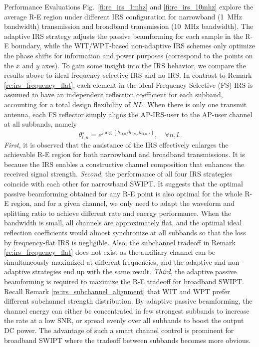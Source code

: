 \documentclass[journal]{IEEEtran}
\begin{document}
\begin{section}{Performance Evaluations}
		Fig.~\ref{fi:re_irs_1mhz} and \ref{fi:re_irs_10mhz} explore the average R-E region under different IRS configuration for narrowband (\SI{1}{\MHz} bandwidth) transmission and broadband transmission (\SI{10}{\MHz} bandwidth). The adaptive IRS strategy adjusts the passive beamforming for each sample in the R-E boundary, while the WIT/WPT-based non-adaptive IRS schemes only optimize the phase shifts for information and power purposes (correspond to the points on the $x$ and $y$ axes). To gain some insight into the IRS behavior, we compare the results above to ideal frequency-selective IRS and no IRS. In contrast to Remark \ref{re:irs_frequency_flat}, each element in the ideal Frequency-Selective (FS) IRS is assumed to have an independent reflection coefficient for each subband, accounting for a total design flexibility of $NL$. When there is only one transmit antenna, each FS reflector simply aligns the AP-IRS-user to the AP-user channel at all subbands, namely
		\begin{equation}
			\theta_{l,n}^{\star}=e^{j\arg{\left(h_{\text{D,}n}/h_{\text{I,}n,l}h_{\text{R,}n,l}\right)}},\quad \forall n,l.
		\end{equation}
		\textit{First}, it is observed that the assistance of the IRS effectively enlarges the achievable R-E region for both narrowband and broadband transmissions. It is because the IRS enables a constructive channel composition that enhances the received signal strength. \textit{Second}, the performance of all four IRS strategies coincide with each other for narrowband SWIPT. It suggests that the optimal passive beamforming obtained for any R-E point is also optimal for the whole R-E region, and for a given channel, we only need to adapt the waveform and splitting ratio to achieve different rate and energy performance. When the bandwidth is small, all channels are approximately flat, and the optimal ideal reflection coefficients would almost synchronize at all subbands so that the loss by frequency-flat IRS is negligible. Also, the subchannel tradeoff in Remark \ref{re:irs_frequency_flat} does not exist as the auxiliary channel can be simultaneously maximized at different frequencies, and the adaptive and non-adaptive strategies end up with the same result. \textit{Third}, the adaptive passive beamforming is required to maximize the R-E tradeoff for broadband SWIPT. Recall Remark \ref{re:irs_subchannel_alignment} that WIT and WPT prefer different subchannel strength distribution. By adaptive passive beamforming, the channel energy can either be concentrated in few strongest subbands to increase the rate at a low SNR, or spread evenly over all subbands to boost the output DC power. The advantage of such a smart channel control is prominent for broadband SWIPT where the tradeoff between subbands becomes more obvious.
	\end{section}
\end{document}
